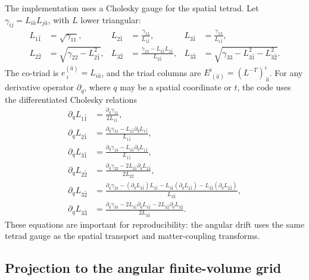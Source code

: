 \documentclass[11pt]{article}
\begin{document}
The implementation uses a Cholesky gauge for the spatial tetrad.  Let
\(\gamma_{ij}=L_{i\hat a}L_{j\hat a}\), with \(L\) lower triangular:
\begin{align}
  L_{1\hat1}&=\sqrt{\gamma_{11}},&
  L_{2\hat1}&=\frac{\gamma_{12}}{L_{1\hat1}},&
  L_{3\hat1}&=\frac{\gamma_{13}}{L_{1\hat1}},\\
  L_{2\hat2}&=\sqrt{\gamma_{22}-L_{2\hat1}^2},&
  L_{3\hat2}&=\frac{\gamma_{23}-L_{3\hat1}L_{2\hat1}}{L_{2\hat2}},&
  L_{3\hat3}&=\sqrt{\gamma_{33}-L_{3\hat1}^2-L_{3\hat2}^2}.
\end{align}
The co-triad is \(e^{(\hat a)}_{\ i}=L_{i\hat a}\), and the triad columns are
\(E^i_{\ (\hat a)}=(L^{-T})^i_{\ \hat a}\).  For any derivative operator
\(\partial_q\), where \(q\) may be a spatial coordinate or \(t\), the code uses
the differentiated Cholesky relations
\begin{align}
  \partial_q L_{1\hat1}
    &=\frac{\partial_q\gamma_{11}}{2L_{1\hat1}},\\
  \partial_q L_{2\hat1}
    &=\frac{\partial_q\gamma_{12}
      -L_{2\hat1}\partial_qL_{1\hat1}}{L_{1\hat1}},\\
  \partial_q L_{3\hat1}
    &=\frac{\partial_q\gamma_{13}
      -L_{3\hat1}\partial_qL_{1\hat1}}{L_{1\hat1}},\\
  \partial_q L_{2\hat2}
    &=\frac{\partial_q\gamma_{22}
      -2L_{2\hat1}\partial_qL_{2\hat1}}{2L_{2\hat2}},\\
  \partial_q L_{3\hat2}
    &=\frac{
      \partial_q\gamma_{23}
      -(\partial_qL_{3\hat1})L_{2\hat1}
      -L_{3\hat1}(\partial_qL_{2\hat1})
      -L_{3\hat2}(\partial_qL_{2\hat2})}
      {L_{2\hat2}},\\
  \partial_q L_{3\hat3}
    &=\frac{\partial_q\gamma_{33}
      -2L_{3\hat1}\partial_qL_{3\hat1}
      -2L_{3\hat2}\partial_qL_{3\hat2}}{2L_{3\hat3}}.
  \label{eq:chol_derivatives}
\end{align}
These equations are important for reproducibility: the angular drift uses the
same tetrad gauge as the spatial transport and matter-coupling transforms.

\subsection{Projection to the angular finite-volume grid}
\end{document}
